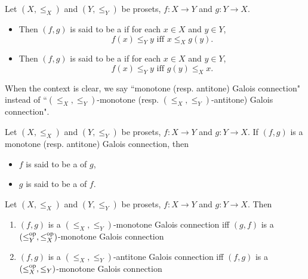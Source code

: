 \documentclass{book}
\begin{document}
	\begin{defn}
		Let $(X, \leq_X)$ and $(Y, \leq_Y)$ be prosets, $f: X \rightarrow Y$ and $g:Y \rightarrow X$. 
		\begin{itemize}
			\item Then $(f, g)$ is said to be a  if for each $x \in X$ and $y \in Y$, 
			$$\text{$f(x) \leq_Y y$ iff $x \leq_X g(y)$.}$$
			\item Then $(f, g)$ is said to be a  if for each $x \in X$ and $y \in Y$, 
			$$\text{$f(x) \leq_Y y$ iff $g(y) \leq_X x$.}$$
		\end{itemize}
	\end{defn}
	
	\begin{note}
		When the context is clear, we say ``monotone (resp. antitone) Galois connection" instead of ``$(\leq_X, \leq_Y)$-monotone (resp. $(\leq_X, \leq_Y)$-antitone) Galois connection".
	\end{note}
	
	\begin{defn}
		Let $(X, \leq_X)$ and $(Y, \leq_Y)$ be prosets, $f: X \rightarrow Y$ and $g:Y \rightarrow X$. If $(f,g)$ is a monotone (resp. antitone) Galois connection, then 
		\begin{itemize}
			\item $f$ is said to be a  of $g$, 
			\item $g$ is said to be a  of $f$.
		\end{itemize}
	\end{defn}
	
	\begin{ex}
		Let $(X, \leq_X)$ and $(Y, \leq_Y)$ be prosets, $f: X \rightarrow Y$ and $g:Y \rightarrow X$. Then 
		\begin{enumerate}
			\item $(f,g)$ is a $(\leq_X, \leq_Y)$-monotone Galois connection iff $(g, f)$ is a $(\leq^{\text{op}}_Y, \leq^{\text{op}}_X)$-monotone Galois connection
			\item $(f,g)$ is a $(\leq_X, \leq_Y)$-antitone Galois connection iff $(f, g)$ is a $(\leq^{\text{op}}_X, \leq_Y)$-monotone Galois connection
		\end{enumerate}
	\end{ex}
	
\end{document}

